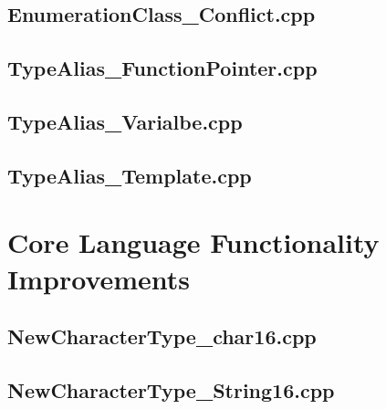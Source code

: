 \documentclass[11pt]{report}
\newcommand{\Cpp}{\lstset{language=C++,keywordstyle=\bfseries,breaklines,breakindent=30pt}}
\begin{document}
\begin{appendix}
\subsection{EnumerationClass\_Conflict.cpp}
\label{EnumerationClass_Conflict}


\subsection{TypeAlias\_FunctionPointer.cpp}
\label{TypeAlias_FunctionPointer}


\subsection{TypeAlias\_Varialbe.cpp}
\label{TypeAlias_Varialbe}


\subsection{TypeAlias\_Template.cpp}
\label{TypeAlias_Template}




\section{Core Language Functionality Improvements}
\label{Appendix: corelanguage functionality improvements}

\Cpp

\subsection{NewCharacterType\_char16.cpp}
\label{NewCharacterType_char16}


\subsection{NewCharacterType\_String16.cpp}
\label{NewCharacterType_String16}



\end{appendix}
\end{document}
